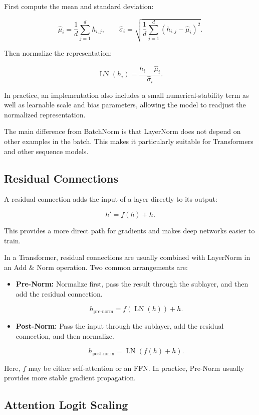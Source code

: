 \documentclass[
  a4paper,
  10pt]{article}
\begin{document}
First compute the mean and standard deviation:

\[
\widehat{\mu}_i
=\frac{1}{d}\sum_{j=1}^{d}h_{i,j},
\qquad
\widehat{\sigma}_i
=\sqrt{
\frac{1}{d}\sum_{j=1}^{d}
\left(h_{i,j}-\widehat{\mu}_i\right)^2
}.
\]

Then normalize the representation:

\[
\operatorname{LN}(h_i)
=\frac{h_i-\widehat{\mu}_i}{\widehat{\sigma}_i}.
\]

In practice, an implementation also includes a small numerical-stability
term as well as learnable scale and bias parameters, allowing the model
to readjust the normalized representation.

The main difference from BatchNorm is that LayerNorm does not depend on
other examples in the batch. This makes it particularly suitable for
Transformers and other sequence models.

\subsection{Residual Connections}\label{residual-connections}

A residual connection adds the input of a layer directly to its output:

\[
h'=f(h)+h.
\]

This provides a more direct path for gradients and makes deep networks
easier to train.

In a Transformer, residual connections are usually combined with
LayerNorm in an Add \& Norm operation. Two common arrangements are:

\begin{itemize}
\item
  \textbf{Pre-Norm:} Normalize first, pass the result through the
  sublayer, and then add the residual connection.

  \[
  h_{\mathrm{pre\text{-}norm}}
  =f\left(\operatorname{LN}(h)\right)+h.
  \]
\item
  \textbf{Post-Norm:} Pass the input through the sublayer, add the
  residual connection, and then normalize.

  \[
  h_{\mathrm{post\text{-}norm}}
  =\operatorname{LN}\left(f(h)+h\right).
  \]
\end{itemize}

Here, \(f\) may be either self-attention or an FFN. In practice,
Pre-Norm usually provides more stable gradient propagation.

\subsection{Attention Logit Scaling}\label{attention-logit-scaling}
\end{document}
